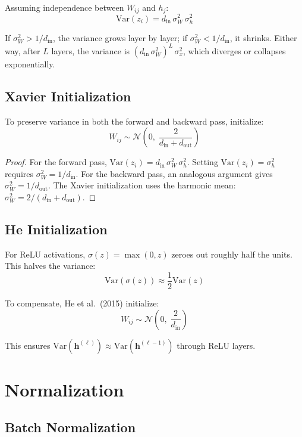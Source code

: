 \documentclass[main.tex]{subfiles}
\begin{document}
Assuming independence between $W_{ij}$ and $h_j$:
$$\text{Var}(z_i) = d_{\text{in}}\,\sigma_W^2\,\sigma_h^2$$

If $\sigma_W^2 > 1/d_{\text{in}}$, the variance grows layer by layer; if $\sigma_W^2 < 1/d_{\text{in}}$, it shrinks. Either way, after $L$ layers, the variance is $(d_{\text{in}}\,\sigma_W^2)^L\,\sigma_x^2$, which diverges or collapses exponentially.

\subsection{Xavier Initialization}

\begin{proposition}
To preserve variance in both the forward and backward pass, initialize:
$$W_{ij} \sim \mathcal{N}\!\left(0,\;\frac{2}{d_{\text{in}} + d_{\text{out}}}\right)$$
\end{proposition}

\begin{proof}
For the forward pass, $\text{Var}(z_i) = d_{\text{in}}\,\sigma_W^2\,\sigma_h^2$. Setting $\text{Var}(z_i) = \sigma_h^2$ requires $\sigma_W^2 = 1/d_{\text{in}}$. For the backward pass, an analogous argument gives $\sigma_W^2 = 1/d_{\text{out}}$. The Xavier initialization uses the harmonic mean: $\sigma_W^2 = 2/(d_{\text{in}} + d_{\text{out}})$.
\end{proof}

\subsection{He Initialization}

For ReLU activations, $\sigma(z) = \max(0,z)$ zeroes out roughly half the units. This halves the variance:
$$\text{Var}(\sigma(z)) \approx \frac{1}{2}\text{Var}(z)$$

To compensate, He et al.\ (2015) initialize:
$$W_{ij} \sim \mathcal{N}\!\left(0,\;\frac{2}{d_{\text{in}}}\right)$$

This ensures $\text{Var}(\mathbf{h}^{(\ell)}) \approx \text{Var}(\mathbf{h}^{(\ell-1)})$ through ReLU layers.

\needspace{0.33\textheight}
\section{Normalization}

\subsection{Batch Normalization}
\end{document}
